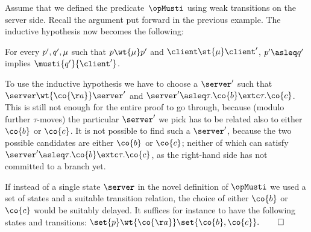 \begin{example}
  Assume that we defined the predicate~$\opMusti$
  using weak transitions on the server side.
  Recall the argument %
  put forward in the previous example.
  The inductive hypothesis now becomes the following:
  \begin{center}
    For every $p', q', \mu$ such that
    $\serverA \wt{\mu} \serverA'$ and $\client \st{\mu} \client'$,
    $\serverA' \asleq \serverB'$ implies $\musti{\serverB'}{\client'}$.
  \end{center}
  To use the inductive hypothesis we have to choose a $\server'$ such
  that $\server \wt{\co{\aa}} \server'$ and $\server' \asleq
  \tau.\co{b} \extc \tau.\co{c}$. This is still not enough for the
  entire proof to go through, because (modulo further $\tau$-moves)
  the particular $\server'$ we pick has to be related also to either
  $\co{b}$ or $\co{c}$. It is not possible to find such a
    $\server'$, because
    the two possible candidates
  are either $\co{b}$
  or $\co{c}$; neither of which can satisfy $\server' \asleq
  \tau.\co{b} \extc \tau.\co{c}$, as the right-hand side has not
  committed to a branch yet.


  If instead of a single state $\server$ in the novel definition of
  $\opMusti$ we used a set of %
  states and a suitable
  transition relation, the choice of either $\co{b}$ or $\co{c}$ would be
  suitably delayed. It suffices for instance to have the following states and transitions:
  $\set{\serverA} \wt{\co{\aa}} \set{\co{b}, \co{c}}.$\hfill$\qed$
\end{example}

